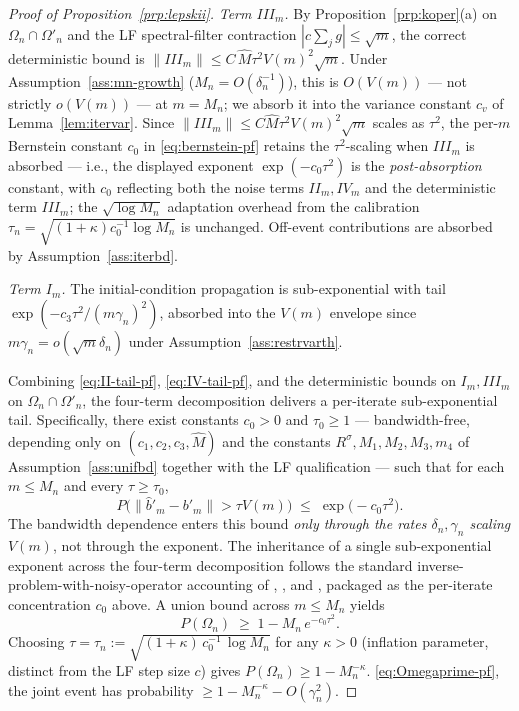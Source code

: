 \begin{proof}[Proof of Proposition~\ref{prp:lepskii}]
\emph{Term $III_m$.} %
By Proposition~\ref{prp:koper}\textup{(a)} on $\Omega_n \cap \Omega'_n$
and the LF spectral-filter contraction $|c\sum_j g| \le \sqrt m$, the
correct deterministic bound is
$\|III_m\| \le C\,\hat M\tau^{2}V(m)^{2}\sqrt m$. Under
Assumption~\ref{ass:mn-growth} ($M_n = O(\delta_n^{-1})$), this is
$O(V(m))$ --- not strictly $o(V(m))$ --- at $m = M_n$; we absorb it
into the variance constant $c_v$ of Lemma~\ref{lem:itervar}.
Since $\|III_m\| \le C\hat M\tau^{2}V(m)^{2}\sqrt m$ scales as
$\tau^{2}$, the per-$m$ Bernstein constant $c_0$ in
\eqref{eq:bernstein-pf} retains the $\tau^{2}$-scaling when $III_m$ is
absorbed --- i.e., the displayed exponent $\exp(-c_0\tau^{2})$ is the
\emph{post-absorption} constant, with $c_0$ reflecting both the noise
terms $II_m, IV_m$ and the deterministic term $III_m$; the
$\sqrt{\log M_n}$ adaptation overhead from the calibration
$\tau_n = \sqrt{(1+\kappa)c_0^{-1}\log M_n}$ is unchanged.
Off-event contributions are absorbed by Assumption~\ref{ass:iterbd}.

\emph{Term $I_m$.} The initial-condition propagation is sub-exponential
with tail $\exp(-c_3 \tau^2/(m\gamma_n)^2)$, absorbed into the $V(m)$
envelope since $m\gamma_n = o(\sqrt m \delta_n)$ under
Assumption~\ref{ass:restrvarth}.

Combining \eqref{eq:II-tail-pf}, \eqref{eq:IV-tail-pf}, and the
deterministic bounds on $I_m, III_m$ on $\Omega_n \cap \Omega'_n$, the
four-term decomposition delivers a per-iterate sub-exponential tail.
Specifically, there exist constants $c_0 > 0$ and $\tau_0 \ge 1$ ---
bandwidth-free, depending only on $(c_1, c_2, c_3, \hat M)$ and the
constants $R^\sigma, M_1, M_2, M_3, m_4$ of Assumption~\ref{ass:unifbd}
together with the LF qualification --- such that for each $m \le M_n$
and every $\tau \ge \tau_0$,
\begin{equation}\label{eq:bernstein-pf}
P\!\bigl(\|\hat b'_m - b'_m\| > \tau V(m)\bigr) \;\le\; \exp\!\bigl(-c_0\tau^2\bigr).
\end{equation}
The bandwidth dependence enters this bound \emph{only through the rates
$\delta_n, \gamma_n$ scaling $V(m)$}, not through the exponent. The
inheritance of a single sub-exponential exponent across the four-term
decomposition follows the standard inverse-problem-with-noisy-operator
accounting of \citet[Section~2]{bauerhohage2005},
\citet[Section~4]{werner2015}, and \citet[Section~3]{hofmannmathe2007},
packaged as the per-iterate concentration $c_0$ above. A union bound across $m \le M_n$ yields
\begin{equation}\label{eq:omegan-prob-pf}
P(\Omega_n) \;\ge\; 1 - M_n\,e^{-c_0\tau^2}.
\end{equation}
Choosing $\tau = \tau_n := \sqrt{(1+\kappa)\,c_0^{-1}\,\log M_n}$ for any
$\kappa > 0$ (inflation parameter, distinct from the LF step size $c$)
gives $P(\Omega_n) \ge 1 - M_n^{-\kappa}$. %
\eqref{eq:Omegaprime-pf}, the joint event has probability $\ge 1 -
M_n^{-\kappa} - O(\gamma_n^2)$.


\end{proof}
